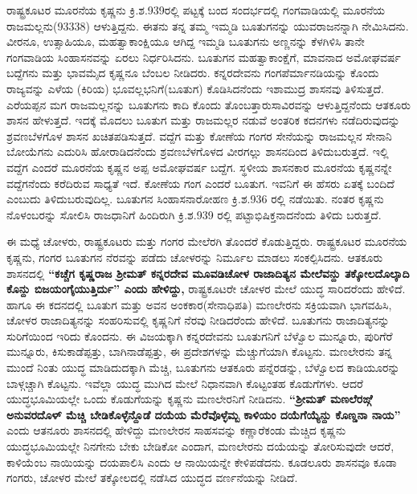 ರಾಷ್ಟ್ರಕೂಟರ ಮೂರನೆಯ ಕೃಷ್ಣನು ಕ್ರಿ.ಶ.939ರಲ್ಲಿ ಪಟ್ಟಕ್ಕೆ ಬಂದ ಸಂದರ್ಭದಲ್ಲಿ ಗಂಗವಾಡಿಯಲ್ಲಿ ಮೂರನೆಯ ರಾಜಮಲ್ಲನು(93338) ಆಳುತ್ತಿದ್ದನು. ಈತನು ತನ್ನ ತಮ್ಮ ಇಮ್ಮಡಿ ಬೂತುಗನನ್ನು ಯುವರಾಜನನ್ನಾಗಿ ನೇಮಿಸಿದನು. ವೀರನೂ, ಉತ್ಸಾಹಿಯೂ, ಮಹತ್ವಾಕಾಂಕ್ಷಿಯೂ ಆಗಿದ್ದ ಇಮ್ಮಡಿ ಬೂತುಗನು ಅಣ್ಣನನ್ನು ಕೆಳಗಿಳಿಸಿ ತಾನೇ ಗಂಗವಾಡಿಯ ಸಿಂಹಾಸನವನ್ನು ಏರಲು ನಿರ್ಧರಿಸಿದನು. ಬೂತುಗನ ಮಹತ್ವಾಕಾಂಕ್ಷೆಗೆ, ಮಾವನಾದ ಅಮೋಘವರ್ಷ ಬದ್ದೆಗನು ಮತ್ತು ಭಾವಮೈದ ಕೃಷ್ಣನೂ ಬೆಂಬಲ ನೀಡಿದರು. ಕನ್ನರದೇವನು ಗಂಗಪೆರ್ಮಾನಡಿಯನ್ನು ಕೊಂದು ರಾಜ್ಯವನ್ನು ಎಳೆಯ (ಕಿರಿಯ) ಭೂವಲ್ಲಭನಿಗೆ(ಬೂತುಗ) ಕೊಡಿಸಿದನೆಂದು ಇಶಾಮುದ್ರ ಶಾಸನವು ತಿಳಿಸುತ್ತದೆ. ಎರೆಯಪ್ಪನ ಮಗ ರಾಜಮಲ್ಲನನ್ನು ಬೂತುಗನು ಕಾದಿ ಕೊಂದು ತೊಂಬತ್ತಾರುಸಾವಿರವನ್ನು ಆಳುತ್ತಿದ್ದನೆಂದು ಆತಕೂರು ಶಾಸನ ಹೇಳುತ್ತದೆ. ಇದಕ್ಕೆ ಮೊದಲು ಬೂತುಗ ಮತ್ತು ರಾಜಮಲ್ಲರ ನಡುವೆ ಅಂತರಿಕ ಕದನಗಳು ನಡೆದಿರುವುದನ್ನು ಶ್ರವಣಬೆಳಗೊಳ ಶಾಸನ ಖಚಿತಪಡಿಸುತ್ತದೆ. ವದ್ದೆಗ ಮತ್ತು ಕೋಣೆಯ ಗಂಗರ ಸೇನೆಯನ್ನು ರಾಜಮಲ್ಲನ ಸೇನಾನಿ ಬೋಯೆಗನು ಎದುರಿಸಿ ಹೋರಾಡಿದನೆಂದು ಶ್ರವಣಬೆಳಗೊಳದ ವೀರಗಲ್ಲು ಶಾಸನದಿಂದ ತಿಳಿದುಬರುತ್ತದೆ. ಇಲ್ಲಿ ವದ್ದೆಗ ಎಂದರೆ ಮೂರನೆಯ ಕೃಷ್ಣನ ಅಪ್ಪ ಅಮೋಘವರ್ಷ ಬದ್ದೆಗ. ಸ್ಥಳೀಯ ಶಾಸನಕಾರ ಮೂರನೆಯ ಕೃಷ್ಣನನ್ನೇ ವದ್ದೆಗನೆಂದು ಕರೆದಿರುವ ಸಾಧ್ಯತೆ ಇದೆ. ಕೋಣೆಯ ಗಂಗ ಎಂದರೆ ಬೂತುಗ. ಇವನಿಗೆ ಈ ಹೆಸರು ಏತಕ್ಕೆ ಬಂದಿದೆ ಎಂಬುದು ತಿಳಿದುಬರುವುದಿಲ್ಲ.\textbf{ }ಬೂತುಗನ ಸಿಂಹಾಸನಾರೋಹಣ ಕ್ರಿ.ಶ.936 ರಲ್ಲಿ ನಡೆಯಿತು. ನಂತರ ಕೃಷ್ಣನು ನೊಳಂಬರನ್ನು ಸೋಲಿಸಿ ರಾಜಧಾನಿಗೆ ಹಿಂದಿರುಗಿ ಕ್ರಿ.ಶ.939 ರಲ್ಲಿ ಪಟ್ಟಾಭಿಷಿಕ್ತನಾದನೆಂದು ತಿಳಿದು ಬರುತ್ತದೆ.

ಈ ಮಧ್ಯೆ ಚೋಳರು, ರಾಷ್ಟ್ರಕೂಟರು ಮತ್ತು ಗಂಗರ ಮೇಲೆರಗಿ ತೊಂದರೆ ಕೊಡುತ್ತಿದ್ದರು. ರಾಷ್ಟ್ರಕೂಟರ ಮೂರನೆಯ ಕೃಷ್ಣನು, ಗಂಗರ ಬೂತುಗನ ನೆರವನ್ನು ಪಡೆದು ಚೋಳರನ್ನು ನಿರ್ಮೂಲ ಮಾಡಲು ಸಂಕಲ್ಪಿಸಿದನು. ಆತಕೂರು ಶಾಸನದಲ್ಲಿ \textbf{“ಕಚ್ಚೆಗ ಕೃಷ್ಣರಾಜ ಶ‍್ರೀಮತ್​ ಕನ್ನರದೇವ ಮೂವಡಿಚೋಳ ರಾಜಾದಿತ್ಯನ ಮೇಲೆವನ್ದು ತಕ್ಕೋಲದೊಲ್ಕಾದಿ ಕೊನ್ದು ಬಿಜಯಂಗೈಯುತ್ತಿರ್ದು” ಎಂದು ಹೇಳಿದ್ದು, }ರಾಷ್ಟ್ರಕೂಟರೇ ಚೋಳರ ಮೇಲೆ ಯುದ್ಧ ಸಾರಿದರೆಂದು ಹೇಳಿದೆ. ಹಾಗೂ ಈ ಕದನದಲ್ಲಿ ಬೂತುಗ ಮತ್ತು ಅವನ ಅಂಕಕಾರ(ಸೇನಾಧಿಪತಿ) ಮಣಲೇರನು ಸಕ್ರಿಯವಾಗಿ ಭಾಗವಹಿಸಿ, ಚೋಳರ ರಾಜಾದಿತ್ಯನನ್ನು ಸಂಹರಿಸುವಲ್ಲಿ ಕೃಷ್ಣನಿಗೆ ನೆರವು ನೀಡಿದರೆಂದು ಹೇಳಿದೆ. ಬೂತುಗನು ರಾಜಾದಿತ್ಯನನ್ನು ಸುರಿಗೆಯಿಂದ ಇರಿದು ಕೊಂದನು. ಈ ವಿಜಯಕ್ಕಾಗಿ ಕನ್ನರದೇವನು ಬೂತುಗನಿಗೆ ಬೆಳ್ವೊಲ ಮುನ್ನೂರು, ಪುರಿಗೆರೆ ಮುನ್ನೂರು, ಕಿಸುಕಾಡೆಪ್ಪತ್ತು, ಬಾಗಿನಾಡೆಪ್ಪತ್ತು, ಈ ಪ್ರದೇಶಗಳನ್ನು ಮೆಚ್ಚುಗೆಯಾಗಿ ಕೊಟ್ಟನು. ಮಣಲೇರನು ತನ್ನ ಮುಂದೆ ನಿಂತು ಯುದ್ಧ ಮಾಡಿದುದಕ್ಕಾಗಿ ಮೆಚ್ಚಿ, ಬೂತುಗನು ಆತಕೂರು ಪನ್ನೆರಡನ್ನು, ಬೆಳ್ವೊಲದ ಕಾಡಿಯೂರನ್ನು ಬಾಳ್ಗಚ್ಚಾಗಿ ಕೊಟ್ಟನು. ಇವೆಲ್ಲಾ ಯುದ್ಧ ಮುಗಿದ ಮೇಲೆ ನಿಧಾನವಾಗಿ ಕೊಟ್ಟಂತಹ ಕೊಡುಗೆಗಳು. ಆದರೆ ಯುದ್ಧಭೂಮಿಯಲ್ಲೇ ಒಂದು ಕೊಡುಗೆಯನ್ನು ಕೃಷ್ಣನು ಮಣಲೇರನಿಗೆ ನೀಡಿದನು. \textbf{“ಶ‍್ರೀಮತ್​ ಮಣಲೆರಙ್ಗೆ ಅನುವರದೊಳ್​ ಮೆಚ್ಚಿ ಬೇಡಿಕೊಳ್ಳೆನ್ದೊಡೆ ದಯೆಯ ಮೆರೆವೊಳ್ಳೆಮ್ಬ ಕಾಳಿಯಂ ದಯೆಗೆಯ್ಯೆನ್ದು ಕೊಣ್ಡನಾ ನಾಯ”} ಎಂದು ಆತನೂರು ಶಾಸನದಲ್ಲಿ ಹೇಳಿದ್ದು ಮಣಲೇರನ ಸಾಹಸವನ್ನು ಕಣ್ಣಾರೆಕಂಡು ಮೆಚ್ಚಿದ ಕೃಷ್ಣನು ಯುದ್ಧಭೂಮಿಯಲ್ಲೇ ನಿನಗೇನು ಬೇಕು ಬೇಡಿಕೋ ಎಂದಾಗ, ಮಣಲೇರನು ದಯೆಯನ್ನು ತೋರಿಸುವುದೇ ಆದರೆ, ಕಾಳಿಯೆಂಬ ನಾಯಿಯನ್ನು ದಯಪಾಲಿಸಿ ಎಂದು ಆ ನಾಯಿಯನ್ನೇ ಕೇಳಿಪಡೆದನು. ಕೂಡಲೂರು ಶಾಸನವೂ ಕೂಡಾ ಗಂಗರು, ಚೋಳರ ಮೇಲೆ ತಕ್ಕೋಲದಲ್ಲಿ ನಡೆಸಿದ ಯುದ್ಧದ ವರ್ಣನೆಯನ್ನು ನೀಡಿದೆ. 

